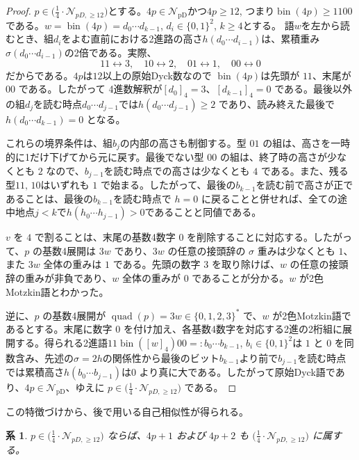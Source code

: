 \documentclass[12pt]{ltjsarticle}
\theoremstyle{plain}
\newtheorem{corollary}[theorem]{系}
\theoremstyle{definition}
\theoremstyle{plain}
\newcommand{\NpD}{\mathcal{N}_{\mathrm{pD}}}
\newcommand{\Pset}{
  \bigl(\tfrac{1}{4}\cdot\mathcal{N}_{pD,\geq 12}\bigr)
}
\begin{document}
\begin{proof}
$p\in\Pset$とする。$4p\in\NpD$かつ$4p\geq12$, つまり$\operatorname{bin}(4p)\geq 1100$である。$w=\operatorname{bin}(4p)=d_{0}\cdots d_{k-1}$, $d_i\in\{0,1\}^2$, $k\geq4$とする。 語$w$を左から読むとき、組$d_i$をよむ直前における2進路の高さ$h(d_0\cdots d_{i-1})$は、累積重み$\sigma(d_0\cdots d_{i-1})$の2倍である。実際、
\[
  11\leftrightarrow3,\quad 10\leftrightarrow2,\quad
  01\leftrightarrow1,\quad 00\leftrightarrow0
\]
だからである。$4p$は$12$以上の原始Dyck数なので $\operatorname{bin}(4p)$は先頭が $11$、末尾が $00$ である。したがって 4進数解釈が$[d_0]_4=3$、$[d_{k-1}]_4=0$ である。最後以外の組$d_{j}$を読む時点$d_0\cdots d_{j-1}$では$h(d_0\cdots d_{j-1})\geq2$ であり、読み終えた最後で $h(d_0\cdots d_{k-1})=0$ となる。

これらの境界条件は、組$b_j$の内部の高さも制御する。型 $01$ の組は、高さを一時的に1だけ下げてから元に戻す。最後でない型 $00$ の組は、終了時の高さが少なくとも $2$ なので、$b_{j-1}$を読む時点での高さは少なくとも $4$ である。また、残る型$11,\, 10$はいずれも $1$ で始まる。したがって、最後の$b_{k-1}$を読む前で高さが正であることは、最後の$b_{k-1}$を読む時点で $h=0$ に戻ることと併せれば、全ての途中地点$j<k$で$h(h_0\cdots h_{j-1})>0$であることと同値である。

$v$ を $4$ で割ることは、末尾の基数4数字 $0$ を削除することに対応する。したがって、$p$ の基数4展開は $3w$ であり、$3w$ の任意の接頭辞の $\sigma$ 重みは少なくとも $1$、また $3w$ 全体の重みは $1$ である。先頭の数字 $3$ を取り除けば、$w$ の任意の接頭辞の重みが非負であり、$w$ 全体の重みが $0$ であることが分かる。$w$ が2色Motzkin語とわかった。

逆に、$p$ の基数4展開が $\operatorname{quad}(p)=3w\in\{0,1,2,3\}^*$ で、$w$ が2色Motzkin語であるとする。末尾に数字 $0$ を付け加え、各基数4数字を対応する2進の2桁組に展開する。得られる2進語$11\operatorname{bin}([w]_4)00=:b_0\cdots b_{k-1}$, $b_i\in\{0,1\}^2$は $1$ と $0$ を同数含み、先述の$\sigma=2h$の関係性から最後のビット$b_{k-1}$より前で$b_{j-1}$を読む時点では累積高さ$h(b_0\cdots b_{j-1})$は$0$ より真に大である。したがって原始Dyck語であり、$4p\in\NpD$、ゆえに $p\in\Pset$ である。
\end{proof}

この特徴づけから、後で用いる自己相似性が得られる。

\begin{corollary}\label{cor:Pclosure}
$p\in\Pset$ ならば、$4p+1$ および $4p+2$ も $\Pset$ に属する。
\end{corollary}
\end{document}
